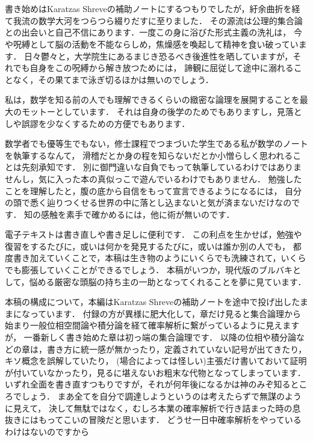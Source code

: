 \chapter*{}
書き始めはKaratzas Shreveの補助ノートにするつもりでしたが，紆余曲折を経て我流の数学大河をつらつら綴りだすに至りました．
その源流は公理的集合論との出会いと自己不信にあります．一度この身に浴びた形式主義の洗礼は，
今や呪縛として脳の活動を不能ならしめ，焦燥感を喚起して精神を食い破っています．
日々鬱々と，大学院生にあるまじき恐るべき後進性を晒していますが，それでも自身をこの呪縛から解き放つためには，
諦観に屈従して途中に溺れることなく，その果てまで泳ぎ切るほかは無いのでしょう．

私は，数学を知る前の人でも理解できるくらいの緻密な論理を展開することを最大のモットーとしています．
それは自身の後学のためでもありますし，見落としや誤謬を少なくするための方便でもあります．
\begin{comment}
巷にあふれる数学書はどういうわけか難解である．
それは主に，厳密性に欠けていたり，論理のギャップが大きかったり，或いは高い水準からスタートしていることに起因している．
他者に向けて書いている筈が著者の知識の整理にしか役に立たないのでは，わざわざ出版する意味は無い．
それから公理を明記していない物が多い．公理の選び方によっていくらでも世界は変わってしまうのだから，
暗黙の了解で済ませるのは横着に思われる．
\end{comment}
数学者でも優等生でもない，修士課程でつまづいた学生である私が数学のノートを執筆するなんて，
滑稽だとか身の程を知らないだとか小憎らしく思われることは先刻承知です．
別に御門違いな自負でもって執筆しているわけではありませんし，気に入った本の真似っこで遊んでいるわけでもありません．
勉強したことを理解したと，腹の底から自信をもって宣言できるようになるには，
自分の頭で悉く辿りつくせる世界の中に落とし込まないと気が済まないだけなのです．
知の感触を素手で確かめるには，他に術が無いのです．

電子テキストは書き直しや書き足しに便利です．
この利点を生かせば，勉強や復習をするたびに，或いは何かを発見するたびに，或いは誰か別の人でも，
都度書き加えていくことで，本稿は生き物のようにいくらでも洗練されて，いくらでも膨張していくことができるでしょう．
本稿がいつか，現代版のブルバキとして，悩める厳密な頭脳の持ち主の一助となってくれることを夢に見ています．

本稿の構成について，本編はKaratzas Shreveの補助ノートを途中で投げ出したままになっています．
付録の方が異様に肥大化して，章だけ見ると集合論理から始まり一般位相空間論や積分論を経て確率解析に繋がっているように見えますが，
一番新しく書き始めた章は初っ端の集合論理です．
以降の位相や積分論などの章は，書き方に統一感が無かったり，定義されていない記号が出てきたり，キソ概念を誤解していたり，
(場合によっては怪しい)主張だけ書いておいて証明が付いていなかったり，見るに堪えないお粗末な代物となってしまっています．
いずれ全面を書き直すつもりですが，それが何年後になるかは神のみぞ知るところでしょう．
まあ全てを自分で調達しようというのは考えたらずで無謀のように見えて，
決して無駄ではなく，むしろ本業の確率解析で行き詰まった時の息抜きにはもってこいの冒険だと思います．
どうせ一日中確率解析をやっているわけはないのですから
\\
\\
\\
